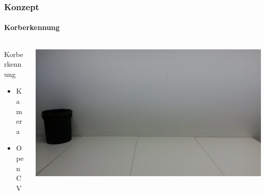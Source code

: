 \begin{frame}
    \frametitle{Konzept}
    \framesubtitle{Korberkennung}
    \begin{columns}
        \begin{column}{0.4\textwidth}
            \begin{block}{Korberkennung}
                \begin{itemize}
                    \item Kamera
                    \item OpenCV
                \end{itemize}
            \end{block}
        \end{column}
        \begin{column}{0.6\textwidth}
            \centering
            \includegraphics[width=1.0\textwidth]{../doc/fig/korb4.jpg}
        \end{column}
    \end{columns}
\end{frame}

